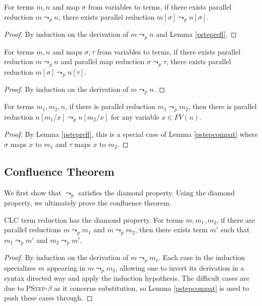\documentclass[sigplan,screen,review,anonymous]{acmart}
\newcommand{\rname}[1]{\textsc{\footnotesize #1}}
\newcommand{\pstep}{\leadsto_p}
\begin{document}
\begin{lemma}
  For terms $m, n$ and map $\sigma$ from variables to terms, if there exists parallel reduction $m \pstep n$, there exists parallel reduction $m[\sigma] \pstep n[\sigma]$.
\end{lemma}
\begin{proof}
  By induction on the derivation of $m \pstep n$ and Lemma \ref{psteprefl}.
\end{proof}

\begin{lemma}\label{pstepcompat}
  For terms $m, n$ and maps $\sigma, \tau$ from variables to terms, if there exists parallel reduction $m \pstep n$ and parallel map reduction $\sigma \pstep \tau$, there exists parallel reduction $m[\sigma] \pstep n[\tau]$.
\end{lemma}
\begin{proof}
  By induction on the derivation of $m \pstep n$.
\end{proof}

\begin{lemma}
  For terms $m_1, m_2, n$, if there is parallel reduction $m_1 \pstep m_2$, then there is parallel reduction $n[m_1/x] \pstep n[m_2/x]$ for any variable $x \in FV(n)$.
\end{lemma}
\begin{proof}
  By Lemma \ref{psteprefl}, this is a special case of Lemma \ref{pstepcompat} where $\sigma$ maps $x$ to $m_1$ and $\tau$ maps $x$ to $m_2$.
\end{proof}

\subsection{Confluence Theorem}
We first show that $\pstep$ satisfies the diamond property. Using the diamond property, we ultimately prove the confluence theorem.

\begin{lemma}\label{diamond}
  CLC term reduction has the diamond property. For terms $m, m_1, m_2$, if there are parallel reductions $m \pstep m_1$ and $m \pstep m_2$, then there exists term $m'$ such that $m_1 \pstep m'$ and $m_2 \pstep m'$.
\end{lemma}
\begin{proof}
  By induction on the derivation of $m \pstep m_1$. Each case in the induction specializes $m$ appearing in $m \pstep m_2$, allowing one to invert its derivation in a syntax directed way and apply the induction hypothesis. The difficult cases are due to \rname{PStep-$\beta$} as it concerns substitution, so Lemma \ref{pstepcompat} is used to push these cases through.
\end{proof}
\end{document}
